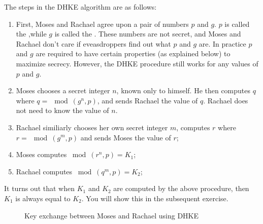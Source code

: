 \begin{flushleft}
The steps in the DHKE algorithm are as follows:
\end{flushleft}
 \begin{enumerate}[Step 1.]
 \item First, Moses and Rachael agree upon a pair of numbers $p$ and $g$. $p$ is called the ,while $g$ is called the . These numbers are not secret, and Moses and Rachael don't care if eveasdroppers find out what $p$ and $g$ are. In practice $p$ and $g$ are required to have certain properties (as explained below) to maximize secrecy.  However, the DHKE procedure still works for any values of $p$ and $g$.
\item Moses chooses a secret integer $n$, known only to himself.  He then computes $q$ where $q =\mod(g^n,p)$, and sends Rachael the value of $q$. Rachael does not need to know the value of $n$.
\item Rachael similiarly chooses her own secret integer $m$, computes $r$ where $r =\mod(g^m,p)$ and sends Moses the value of $r$;
\item Moses computes $ \bmod (r^n , p ) = K_1$;
\item Rachael computes $ \bmod (q^m , p ) = K_2$;
\end{enumerate} 
It turns out that when $K_1$ and $K_2$ are computed by the above procedure, then $K_1$ is always equal to $K_2$.  You will show this in the subsequent exercise.  
\begin{figure}[htb]
	  \caption{\label{fig:DH:DHKE_1} Key exchange between Moses and Rachael using DHKE}
\end{figure}


